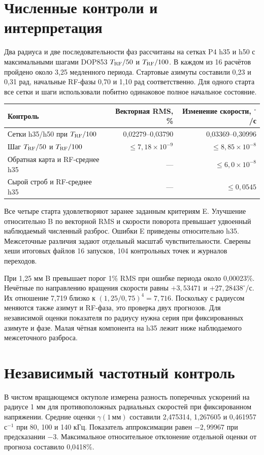 \documentclass[11pt,a4paper]{article}
\begin{document}
\newpage
\section*{Численные контроли и интерпретация}

Два радиуса и две последовательности фаз рассчитаны на сетках P4 h35 и h50
с максимальными шагами DOP853 $T_{\rm RF}/50$ и $T_{\rm RF}/100$.
В каждом из 16 расчётов пройдено около 3,25 медленного периода.
Стартовые азимуты составили 0,23 и 0,31 рад, начальные RF-фазы 0,70 и
1,10 рад соответственно. Для одного старта все сетки и шаги использовали
побитно одинаковое полное начальное состояние.

\begin{center}
\small
\begin{tabular}{@{}lrr@{}}
\toprule
Контроль & Векторная RMS, \% & Изменение скорости, $^\circ$/с \\
\midrule
Сетки h35/h50 при $T_{\rm RF}/100$ & 0,02279--0,03790 & 0,03369--0,30996 \\
Шаг $T_{\rm RF}/50$ и $T_{\rm RF}/100$ & $\leq 7{,}18\times10^{-9}$ & $\leq 8{,}85\times10^{-8}$ \\
Обратная карта и RF-среднее h35 & --- & $\leq 6{,}0\times10^{-8}$ \\
Сырой строб и RF-среднее h35 & --- & $\leq 0{,}0545$ \\
\bottomrule
\end{tabular}
\end{center}

Все четыре старта удовлетворяют заранее заданным критериям E.
Улучшение относительно B по векторной RMS и скорости поворота превышает
удвоенный наблюдаемый численный разброс. Ошибки E приведены относительно
h35. Межсеточные различия задают отдельный масштаб чувствительности.
Сверены хеши итоговых файлов 16 запусков, 104 контрольных точек
и журналов переходов.

При 1,25 мм B превышает порог 1\% RMS при ошибке периода около 0,00023\%.
Нечётные по направлению вращения скорости равны $+3{,}53471$ и
$+27{,}28438^\circ$/с. Их отношение 7,719 близко к
$(1{,}25/0{,}75)^4=7{,}716$. Поскольку с радиусом меняются также азимут и
RF-фаза, это проверка двух прогнозов. Для независимой оценки показателя по
радиусу нужна серия при фиксированных азимуте и фазе. Малая чётная
компонента на h35 лежит ниже наблюдаемого межсеточного разброса.

\section*{Независимый частотный контроль}
В чистом вращающемся октуполе измерена разность поперечных ускорений
на радиусе 1 мм для противоположных радиальных скоростей при фиксированном
напряжении. Средние оценки $\gamma(1\,\text{мм})$ составили 2,475314,
1,267605 и 0,461957 с$^{-1}$ при 80, 100 и 140 кГц. Показатель аппроксимации
равен $-2{,}99967$ при предсказании $-3$. Максимальное относительное
отклонение отдельной оценки от прогноза составило 0,0418\%.
\end{document}

